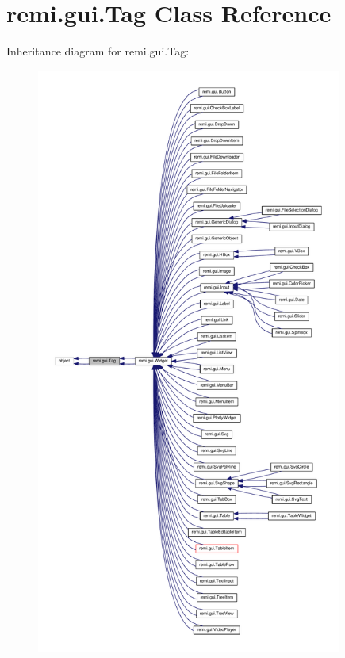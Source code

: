 \hypertarget{classremi_1_1gui_1_1Tag}{}\section{remi.\+gui.\+Tag Class Reference}
\label{classremi_1_1gui_1_1Tag}


Inheritance diagram for remi.\+gui.\+Tag\+:
\nopagebreak
\begin{figure}[H]
\begin{center}
\leavevmode
\includegraphics[height=550pt]{df/d46/classremi_1_1gui_1_1Tag__inherit__graph}
\end{center}
\end{figure}



